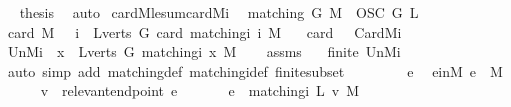 \begin{isabellebody}
\ \isamarkupfalse%
\ {\isacharquery}thesis\ \isamarkupfalse%
\ auto\isanewline
{}\isamarkupfalse%
%
\endisatagproof
{\isafoldproof}%
%
\isadelimproof
\isanewline
%
\endisadelimproof
\isanewline
{}\isamarkupfalse%
\ card{\isacharunderscore}M{\isacharunderscore}le{\isacharunderscore}sum{\isacharunderscore}card{\isacharunderscore}Mi{\isacharcolon}\ \isanewline
{}\ {\isachardoublequoteopen}matching\ G\ M{\isachardoublequoteclose}\ \ {\isachardoublequoteopen}OSC\ G\ L{\isachardoublequoteclose}\isanewline
{}\ {\isachardoublequoteopen}card\ M\ {\isasymle}\ {\isacharparenleft}{\isasymSum}\ i\ {\isasymin}\ L{\isacharbackquote}verts\ G{\isachardot}\ card\ {\isacharparenleft}matching{\isacharunderscore}i\ i\ M{\isacharparenright}{\isacharparenright}{\isachardoublequoteclose}\isanewline
\ \ {\isacharparenleft}\ {\isachardoublequoteopen}card\ {\isacharunderscore}\ {\isasymle}\ {\isacharquery}CardMi{\isachardoublequoteclose}{\isacharparenright}\isanewline
%
\isadelimproof
%
\endisadelimproof
%
\isatagproof
{}\isamarkupfalse%
\ {\isacharminus}\isanewline
\ \ \isamarkupfalse%
\ {\isacharquery}UnMi\ {\isacharequal}\ {\isachardoublequoteopen}{\isasymUnion}x\ {\isasymin}\ L{\isacharbackquote}verts\ G{\isachardot}\ matching{\isacharunderscore}i\ x\ M{\isachardoublequoteclose}\isanewline
\ \ \isamarkupfalse%
\ assms\ \isamarkupfalse%
\ {}{\isacharcolon}\ {\isachardoublequoteopen}finite\ {\isacharquery}UnMi{\isachardoublequoteclose}\isanewline
\ \ \ \ \isamarkupfalse%
\ {\isacharparenleft}auto\ simp\ add{\isacharcolon}\ matching{\isacharunderscore}def\ matching{\isacharunderscore}i{\isacharunderscore}def\ finite{\isacharunderscore}subset{\isacharparenright}\isanewline
\ \ \isacommand{{\isacharbraceleft}}\isamarkupfalse%
\isanewline
\ \ \ \ \isamarkupfalse%
\ e\ \isamarkupfalse%
\ e{\isacharunderscore}inM{\isacharcolon}\ {\isachardoublequoteopen}e\ {\isasymin}\ M{\isachardoublequoteclose}\isanewline
\ \ \ \ \isamarkupfalse%
\ {\isacharquery}v\ {\isacharequal}\ {\isachardoublequoteopen}relevant{\isacharunderscore}endpoint\ e{\isachardoublequoteclose}\isanewline
\ \ \ \ \isamarkupfalse%
\ {}{\isacharcolon}\ {\isachardoublequoteopen}e\ {\isasymin}\ matching{\isacharunderscore}i\ {\isacharparenleft}L\ {\isacharquery}v{\isacharparenright}\ M{\isachardoublequoteclose}\ \isamarkupfalse%

\end{isabellebody}
